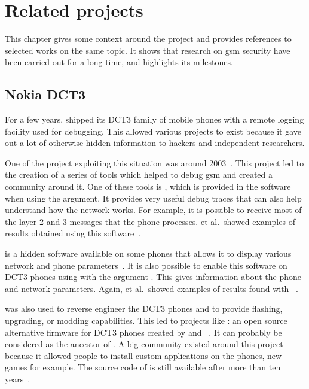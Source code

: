 \chapter{Related projects}
\label{chap:related_projects}

    This chapter gives some context around the  project
    and provides references to selected works on the same topic. It
    shows that research on \gls{gsm} security have been carried out for
    a long time, and highlights its milestones.

    \section{Nokia DCT3}

      For a few years,  shipped its DCT3 family of mobile
      phones with a remote logging facility used for debugging. This
      allowed various projects to exist because it gave out a lot of
      otherwise hidden information to hackers and independent
      researchers.

      One of the project exploiting this situation was  around 2003~\cite{project_????}. This project led to
      the creation of a series of tools which helped to debug \gls{gsm}
      and created a community around it. One of these tools is
      , which is provided in the 
      software when using the  argument. It provides
      very useful debug traces that can also help understand how the
      network works. For example, it is possible to receive most of the
      layer 2 and 3 messages that the phone processes. 
      et al.\ showed examples of results obtained using this
      software~\cite[p.~89]{glendrange_decoding_2010}.

       is a hidden software available on some phones
      that allows it to display various network and phone
      parameters~\cite{wiacek_netmonitor_2002}. It is also possible to
      enable this software on DCT3 phones using  with the
      argument . This gives information about the
      phone and network parameters. Again,  et al.\
      showed examples of results found with 
      ~\cite[p.~85]{glendrange_decoding_2010}.

       was also used to reverse engineer the DCT3
      phones and to provide flashing, upgrading, or modding
      capabilities. This led to projects like : an open
      source alternative firmware for DCT3 phones created by
       and ~\cite{project_????}. It can
      probably be considered as the ancestor of \proj{OsmocomBB}. A big
      community existed around this project because it allowed people to
      install custom applications on the phones, new games for example.
      The source code of \proj{MADos} is still available after more than
      ten years~\cite{index_????}.

